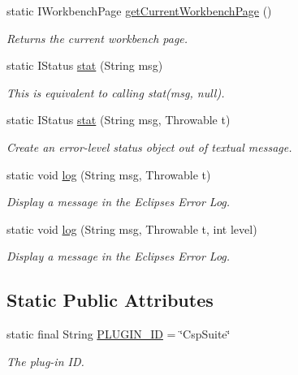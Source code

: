 \begin{DoxyCompactItemize}
static I\+Workbench\+Page \hyperlink{classcom_1_1fware_1_1cspdt_1_1cspm_1_1editor_1_1_csp_m_editor_plugin_a42cad1fb2c902c98a3e479bd45c6e0ab}{get\+Current\+Workbench\+Page} ()
\begin{DoxyCompactList}\small\item\em Returns the current workbench page. \end{DoxyCompactList}\item 
static I\+Status \hyperlink{classcom_1_1fware_1_1cspdt_1_1cspm_1_1editor_1_1_csp_m_editor_plugin_a5b396412e4eaff95c0edf8b65ea055fd}{stat} (String msg)
\begin{DoxyCompactList}\small\item\em This is equivalent to calling {\ttfamily stat(msg, null)}. \end{DoxyCompactList}\item 
static I\+Status \hyperlink{classcom_1_1fware_1_1cspdt_1_1cspm_1_1editor_1_1_csp_m_editor_plugin_a8f6c15a840760c132d98bbae18564db3}{stat} (String msg, Throwable t)
\begin{DoxyCompactList}\small\item\em Create an error-\/level status object out of textual message. \end{DoxyCompactList}\item 
static void \hyperlink{classcom_1_1fware_1_1cspdt_1_1cspm_1_1editor_1_1_csp_m_editor_plugin_a54650677eefb50d1f6f2a6ba7a76f81c}{log} (String msg, Throwable t)
\begin{DoxyCompactList}\small\item\em Display a message in the Eclipse\textquotesingle{}s Error Log. \end{DoxyCompactList}\item 
static void \hyperlink{classcom_1_1fware_1_1cspdt_1_1cspm_1_1editor_1_1_csp_m_editor_plugin_a2c4fa5b39642bfadc3af60a6ea74065c}{log} (String msg, Throwable t, int level)
\begin{DoxyCompactList}\small\item\em Display a message in the Eclipse\textquotesingle{}s Error Log. \end{DoxyCompactList}\end{DoxyCompactItemize}
\subsection*{Static Public Attributes}
\begin{DoxyCompactItemize}
\item 
static final String \hyperlink{classcom_1_1fware_1_1cspdt_1_1cspm_1_1editor_1_1_csp_m_editor_plugin_a52beb6e08f5faf5ef31066ebb304d825}{P\+L\+U\+G\+I\+N\+\_\+\+ID} = \char`\"{}Csp\+Suite\char`\"{}
\begin{DoxyCompactList}\small\item\em The plug-\/in ID. \end{DoxyCompactList}\end{DoxyCompactItemize}
